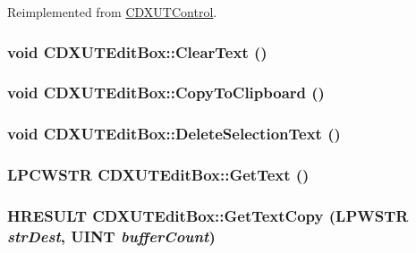 Reimplemented from \hyperlink{class_c_d_x_u_t_control_a5b2c6c474236a79b257c86caded9c0b7}{CDXUTControl}.\hypertarget{class_c_d_x_u_t_edit_box_a769bc1130895f3d116b45a4f25bc3b78}{
\subsubsection[{ClearText}]{\setlength{\rightskip}{0pt plus 5cm}void CDXUTEditBox::ClearText ()}}
\label{class_c_d_x_u_t_edit_box_a769bc1130895f3d116b45a4f25bc3b78}
\hypertarget{class_c_d_x_u_t_edit_box_aebc41325d7ea210942b6c96c9df6d89e}{
\subsubsection[{CopyToClipboard}]{\setlength{\rightskip}{0pt plus 5cm}void CDXUTEditBox::CopyToClipboard ()}}
\label{class_c_d_x_u_t_edit_box_aebc41325d7ea210942b6c96c9df6d89e}
\hypertarget{class_c_d_x_u_t_edit_box_a706a8b318a003975afc8db51ec233d70}{
\subsubsection[{DeleteSelectionText}]{\setlength{\rightskip}{0pt plus 5cm}void CDXUTEditBox::DeleteSelectionText ()}}
\label{class_c_d_x_u_t_edit_box_a706a8b318a003975afc8db51ec233d70}
\hypertarget{class_c_d_x_u_t_edit_box_a7d20deae894a3a0259a2e9fca551371d}{
\subsubsection[{GetText}]{\setlength{\rightskip}{0pt plus 5cm}LPCWSTR CDXUTEditBox::GetText ()}}
\label{class_c_d_x_u_t_edit_box_a7d20deae894a3a0259a2e9fca551371d}
\hypertarget{class_c_d_x_u_t_edit_box_aa1b4a760e28f3176c18bd635c88525f5}{
\subsubsection[{GetTextCopy}]{\setlength{\rightskip}{0pt plus 5cm}HRESULT CDXUTEditBox::GetTextCopy ({\bf LPWSTR} {\em strDest}, \/  UINT {\em bufferCount})}}
